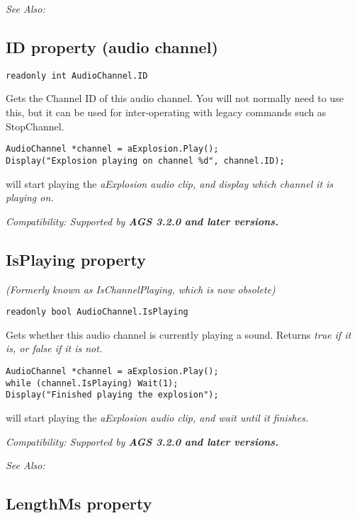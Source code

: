 \it{See Also:} 


\subsection{ID property (audio channel)}\label{AudioChannel.ID}%

\begin{verbatim}
readonly int AudioChannel.ID
\end{verbatim}
Gets the Channel ID of this audio channel. You will not normally need to use this,
but it can be used for inter-operating with legacy commands such as StopChannel.

\begin{verbatim}
AudioChannel *channel = aExplosion.Play();
Display("Explosion playing on channel %d", channel.ID);
\end{verbatim}
will start playing the \it{aExplosion} audio clip, and display which channel it is playing on.

\it{Compatibility:} Supported by \bf{AGS 3.2.0} and later versions.


\subsection{IsPlaying property}\label{AudioChannel.IsPlaying}%

\it{(Formerly known as IsChannelPlaying, which is now obsolete)}

\begin{verbatim}
readonly bool AudioChannel.IsPlaying
\end{verbatim}
Gets whether this audio channel is currently playing a sound. Returns \it{true} if it is,
or \it{false} if it is not.

\begin{verbatim}
AudioChannel *channel = aExplosion.Play();
while (channel.IsPlaying) Wait(1);
Display("Finished playing the explosion");
\end{verbatim}
will start playing the \it{aExplosion} audio clip, and wait until it finishes.

\it{Compatibility:} Supported by \bf{AGS 3.2.0} and later versions.

\it{See Also:} 


\subsection{LengthMs property}\label{AudioChannel.LengthMs}%

